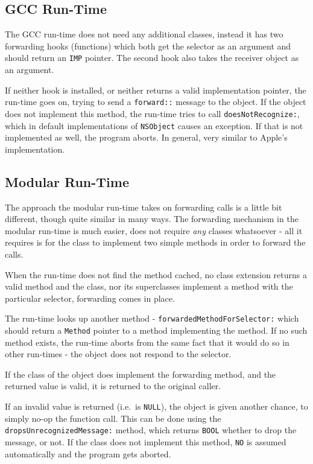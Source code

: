 \subsection{GCC Run-Time}

The GCC run-time does not need any additional classes, instead it has two forwarding hooks (functions) which both get the selector as an argument and should return an \verb=IMP= pointer. The second hook also takes the receiver object as an argument.

If neither hook is installed, or neither returns a valid implementation pointer, the run-time goes on, trying to send a \verb=forward::= message to the object. If the object does not implement this method, the run-time tries to call \verb=doesNotRecognize:=, which in default implementations of \verb=NSObject= causes an exception. If that is not implemented as well, the program aborts. In general, very similar to Apple's implementation.

\subsection{Modular Run-Time}
 
The approach the modular run-time takes on forwarding calls is a little bit different, though quite similar in many ways. The forwarding mechanism in the modular run-time is much easier, does not require \emph{any} classes whatsoever - all it requires is for the class to implement two simple methods in order to forward the calls.

When the run-time does not find the method cached, no class extension returns a valid method and the class, nor its superclasses implement a method with the particular selector, forwarding comes in place.

The run-time looks up another method - \verb=forwardedMethodForSelector:= which should return a \verb=Method= pointer to a method implementing the method. If no such method exists, the run-time aborts from the same fact that it would do so in other run-times - the object does not respond to the selector.

If the class of the object does implement the forwarding method, and the returned value is valid, it is returned to the original caller.

If an invalid value is returned (i.e.\ is \verb=NULL=), the object is given another chance, to simply no-op the function call. This can be done using the \newline{}\verb=dropsUnrecognizedMessage:= method, which returns \verb=BOOL= whether to drop the message, or not. If the class does not implement this method, \verb=NO= is assumed automatically and the program gets aborted.

